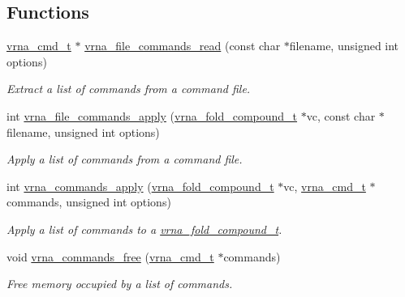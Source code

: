 \subsection*{Functions}
\begin{DoxyCompactItemize}
\item 
\mbox{\hyperlink{group__file__utils_ga92cb3b5952352b103bcb32e5a99e0e5a}{vrna\+\_\+cmd\+\_\+t}} $\ast$ \mbox{\hyperlink{group__file__utils_ga5d2a64331cff5b1059e7d327545d8a63}{vrna\+\_\+file\+\_\+commands\+\_\+read}} (const char $\ast$filename, unsigned int options)
\begin{DoxyCompactList}\small\item\em Extract a list of commands from a command file. \end{DoxyCompactList}\item 
int \mbox{\hyperlink{group__file__utils_gadbe8c9622f7bcc6dcbe3448b98df8656}{vrna\+\_\+file\+\_\+commands\+\_\+apply}} (\mbox{\hyperlink{group__fold__compound_ga1b0cef17fd40466cef5968eaeeff6166}{vrna\+\_\+fold\+\_\+compound\+\_\+t}} $\ast$vc, const char $\ast$filename, unsigned int options)
\begin{DoxyCompactList}\small\item\em Apply a list of commands from a command file. \end{DoxyCompactList}\item 
int \mbox{\hyperlink{group__file__utils_ga5e993fc4b9602af73aaaab4d3b3cd9a9}{vrna\+\_\+commands\+\_\+apply}} (\mbox{\hyperlink{group__fold__compound_ga1b0cef17fd40466cef5968eaeeff6166}{vrna\+\_\+fold\+\_\+compound\+\_\+t}} $\ast$vc, \mbox{\hyperlink{group__file__utils_ga92cb3b5952352b103bcb32e5a99e0e5a}{vrna\+\_\+cmd\+\_\+t}} $\ast$commands, unsigned int options)
\begin{DoxyCompactList}\small\item\em Apply a list of commands to a \mbox{\hyperlink{group__fold__compound_ga1b0cef17fd40466cef5968eaeeff6166}{vrna\+\_\+fold\+\_\+compound\+\_\+t}}. \end{DoxyCompactList}\item 
void \mbox{\hyperlink{group__file__utils_ga926fd7632e68f3da2e2069402b80b1ab}{vrna\+\_\+commands\+\_\+free}} (\mbox{\hyperlink{group__file__utils_ga92cb3b5952352b103bcb32e5a99e0e5a}{vrna\+\_\+cmd\+\_\+t}} $\ast$commands)
\begin{DoxyCompactList}\small\item\em Free memory occupied by a list of commands. \end{DoxyCompactList}\item 

\end{DoxyCompactItemize}
